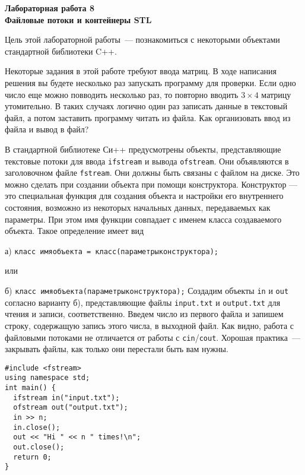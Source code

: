 \documentclass{article}
\begin{document}
\noindent
\textbf{Лабораторная работа 8}\\
{\Large \textbf{Файловые потоки и контейнеры STL}}\\
\strut\hfill{}

Цель этой лабораторной работы~--- познакомиться с некоторыми объектами стандартной библиотеки C++.

Некоторые задания в этой работе требуют ввода матриц. В ходе написания решения вы будете несколько раз запускать программу для проверки. Если одно число еще можно повводить несколько раз, то повторно вводить $3\times4$ матрицу утомительно. В таких случаях логично один раз записать данные в текстовый файл, а потом заставить программу читать из файла. Как организовать ввод из файла и вывод в файл? 

В стандартной библиотеке Си++ предусмотрены объекты, представляющие текстовые потоки для ввода \texttt{ifstream} и вывода \texttt{ofstream}. Они объявляются в заголовочном файле \texttt{fstream}. Они должны быть связаны с файлом на диске. Это можно сделать при создании объекта при помощи конструктора. Конструктор — это специальная функция для создания объекта и настройки его внутреннего состояния, возможно из некоторых начальных данных, передаваемых как параметры. При этом имя функции совпадает с именем класса создаваемого объекта. Такое определение имеет вид
\trivlist
\item
  \strut\quad а) \texttt{{\color[rgb]{0.17,0.57,0.69}класс} имяобъекта = {\color[rgb]{0.17,0.57,0.69}класс}({\color[rgb]{0.64,0.08,0.08}параметрыконструктора});}
\item 
  или 
\item
  \strut\quad б) \texttt{{\color[rgb]{0.17,0.57,0.69}класс} имяобъекта({\color[rgb]{0.64,0.08,0.08}параметрыконструктора});}
\endtrivlist
Создадим объекты \texttt{in} и \texttt{out} согласно варианту б), представляющие файлы \texttt{input.txt} и \texttt{output.txt} для чтения и записи, соответственно. Введем число из первого файла и запишем строку, содержащую запись этого числа, в выходной файл. Как видно, работа с файловыми потоками не отличается от работы с \texttt{cin}/\texttt{cout}. Хорошая практика~--- закрывать файлы, как только они перестали быть вам нужны.
\begin{verbatim}
#include <fstream>
using namespace std;
int main() {
  ifstream in("input.txt");
  ofstream out("output.txt");
  in >> n;
  in.close();
  out << "Hi " << n " times!\n";
  out.close();
  return 0;
}
\end{verbatim}
\end{document}
